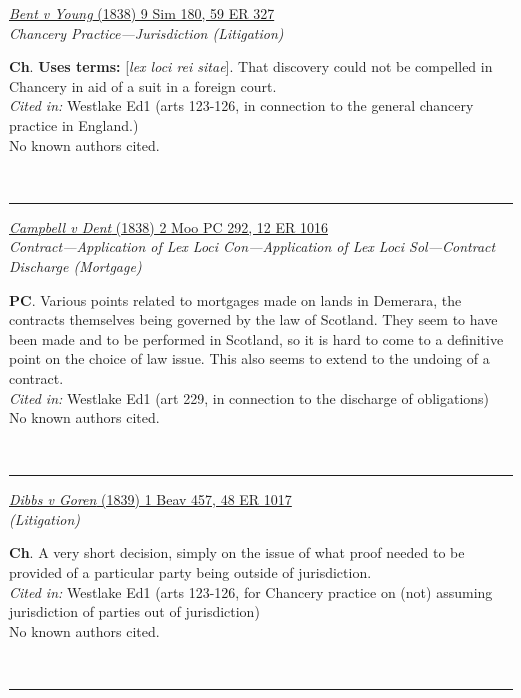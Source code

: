 \documentclass[twoside]{article}
\begin{document}
        \begin{small}
        \begin{center}
        \href{https://heinonline.org/HOL/P?h=hein.engrep/engre0059&i=335}{\textit{Bent v Young} (1838) 9 Sim 180, 59 ER 327} \label{97} \\ 
\textit{Chancery Practice---Jurisdiction (Litigation)}\\
        \end{center}
        \textbf{Ch}.  \textbf{Uses terms: }[\textit{lex loci rei sitae}]. That discovery could not be compelled in Chancery in aid of a suit in a foreign court.\\\textit{Cited in: }Westlake Ed1 (arts 123-126, in connection to the general chancery practice in England.)\\No known authors cited.
        \end{small}\\
        \rule{\textwidth}{0.5pt}
        

        \begin{small}
        \begin{center}
        \href{https://heinonline.org/HOL/P?h=hein.engrep/engrb0012&i=1024}{\textit{Campbell v Dent} (1838) 2 Moo PC 292, 12 ER 1016} \label{102} \\ 
\textit{Contract---Application of Lex Loci Con---Application of Lex Loci Sol---Contract Discharge (Mortgage)}\\
        \end{center}
        \textbf{PC}. Various points related to mortgages made on lands in Demerara, the contracts themselves being governed by the law of Scotland. They seem to have been made and to be performed in Scotland, so it is hard to come to a definitive point on the choice of law issue. This also seems to extend to the undoing of a contract.\\\textit{Cited in: }Westlake Ed1 (art 229, in connection to the discharge of obligations)\\No known authors cited.
        \end{small}\\
        \rule{\textwidth}{0.5pt}
        

        \begin{small}
        \begin{center}
        \href{https://heinonline.org/HOL/P?h=hein.engrep/engrd0048&i=1025}{\textit{Dibbs v Goren} (1839) 1 Beav 457, 48 ER 1017} \label{95} \\ 
\textit{ (Litigation)}\\
        \end{center}
        \textbf{Ch}. A very short decision, simply on the issue of what proof needed to be provided of a particular party being outside of jurisdiction.\\\textit{Cited in: }Westlake Ed1 (arts 123-126, for Chancery practice on (not) assuming jurisdiction of parties out of jurisdiction)\\No known authors cited.
        \end{small}\\
        \rule{\textwidth}{0.5pt}
        
\end{document}
